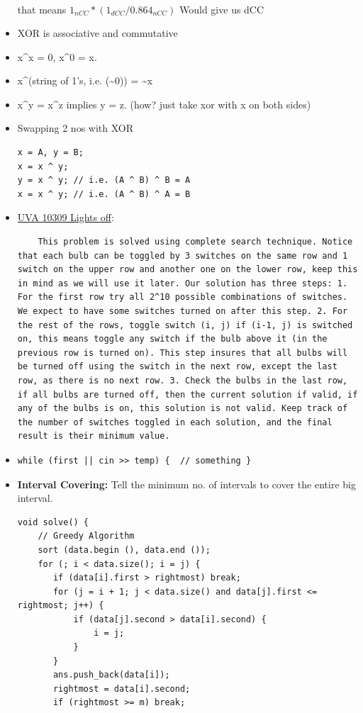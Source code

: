 \documentclass[8pt, a4paper, oneside, twocolumn]{extarticle}
\begin{document}
\begin{itemize}
\begin{eqnarray}
    \end{eqnarray}
    that means $1_{nCC} * (1_{dCC}/0.864_{nCC})$ Would give us dCC
    \item XOR is associative and commutative
    \item x\^{}x = 0, x\^{}0 = x.
    \item x\^{}(string of 1's, i.e. (\~{}0)) = \~{}x
    \item x\^{}y = x\^{}z implies y = z. (how? just take xor with x on both sides)
    \item Swapping 2 nos with XOR
    \begin{verbatim}
x = A, y = B;
x = x ^ y;
y = x ^ y; // i.e. (A ^ B) ^ B = A
x = x ^ y; // i.e. (A ^ B) ^ A = B
    \end{verbatim}
    \item \href{}{UVA 10309 Lights off}:
    \begin{verbatim}
    This problem is solved using complete search technique. Notice that each bulb can be toggled by 3 switches on the same row and 1 switch on the upper row and another one on the lower row, keep this in mind as we will use it later. Our solution has three steps: 1. For the first row try all 2^10 possible combinations of switches. We expect to have some switches turned on after this step. 2. For the rest of the rows, toggle switch (i, j) if (i-1, j) is switched on, this means toggle any switch if the bulb above it (in the previous row is turned on). This step insures that all bulbs will be turned off using the switch in the next row, except the last row, as there is no next row. 3. Check the bulbs in the last row, if all bulbs are turned off, then the current solution if valid, if any of the bulbs is on, this solution is not valid. Keep track of the number of switches toggled in each solution, and the final result is their minimum value.
    \end{verbatim}
    \item \begin{verbatim}
while (first || cin >> temp) {  // something }
            \end{verbatim}
    \item \textbf{Interval Covering: }Tell the minimum no. of intervals to cover the entire big interval.
    \begin{verbatim}
void solve() {
    // Greedy Algorithm
    sort (data.begin (), data.end ()); 
    for (; i < data.size(); i = j) {
       if (data[i].first > rightmost) break;
       for (j = i + 1; j < data.size() and data[j].first <= rightmost; j++) {
           if (data[j].second > data[i].second) {
               i = j;
           }
       }
       ans.push_back(data[i]);
       rightmost = data[i].second;
       if (rightmost >= m) break;


\end{verbatim}
\end{itemize}
\end{document}

